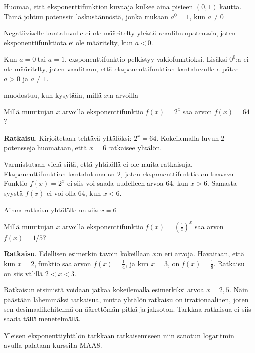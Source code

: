 Huomaa, että eksponenttifunktion kuvaaja kulkee aina pisteen $(0,1)$ kautta. Tämä johtuu potenssin laskusäännöstä, jonka mukaan $a^0=1$, kun $a\neq0$

Negatiiviselle kantaluvulle ei ole määritelty yleistä reaalilukupotenssia, joten eksponenttifunktiota ei ole määritelty, kun $a < 0$. 

Kun $a=0$ tai $a=1$, eksponenttifunktio pelkistyy vakiofunktioksi. Lisäksi $0^0$:a ei ole määritelty, joten vaaditaan, että eksponenttifunktion kantaluvulle $a$ pätee $a>0$ ja $a \neq 1$.

 muodostuu, kun kysytään, millä $x$:n arvoilla %

\begin{esimerkki}
Millä muuttujan $x$ arvoilla eksponenttifunktio $f(x) = 2^x$ saa arvon
$f(x) = 64$?

\textbf{Ratkaisu.}
Kirjoitetaan tehtävä yhtälöksi: $2^x = 64$. Kokeilemalla luvun $2$ potensseja huomataan,
että $x = 6$ ratkaisee yhtälön.

Varmistutaan vielä siitä, että yhtälöllä ei ole muita ratkaisuja. Eksponenttifunktion kantalukuna on $2$, joten eksponenttifunktio on kasvava. Funktio $f(x) = 2^x$ ei siis voi saada uudelleen arvoa $64$, kun $x > 6$. Samasta syystä $f(x)$ ei voi olla $64$, kun $x < 6$.

Ainoa ratkaisu yhtälölle on siis $x = 6$.
\end{esimerkki}

\begin{esimerkki}
Millä muuttujan $x$ arvoilla eksponenttifunktio
$f(x) = \left( \frac{1}{2} \right)^{x}$ saa arvon $f(x) = 1/5$?

\textbf{Ratkaisu.}
Edellisen esimerkin tavoin kokeillaan $x$:n eri arvoja. Havaitaan, että kun $x = 2$, funktio saa arvon $f(x) = \frac{1}{4}$, ja kun $x = 3$, on $f(x) = \frac{1}{8}$. Ratkaisu on siis välillä $2 < x < 3$.

Ratkaisun etsimistä voidaan jatkaa kokeilemalla esimerkiksi arvoa $x = 2,5$. Näin päästään lähemmäksi ratkaisua, mutta yhtälön ratkaisu on irrationaalinen, joten sen desimaalikehitelmä on äärettömän pitkä ja jaksoton. Tarkkaa ratkaisua ei siis saada tällä menetelmällä.

\end{esimerkki}

Yleisen eksponenttiyhtälön tarkkaan ratkaisemiseen niin sanotun logaritmin avulla palataan kurssilla MAA8. %

